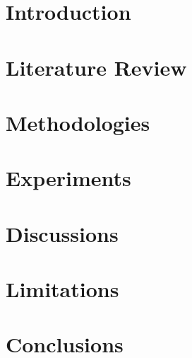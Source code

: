 \documentclass[a4paper]{ustthesis}
\begin{document}
\chapter{Introduction}
\label{ch_intro}

\newpage

% 

\chapter{Literature Review}
\label{ch_review}

\newpage

\chapter{Methodologies}
\label{ch_methodologies}

\newpage

\chapter{Experiments}
\label{ch_experiments}

\newpage

\chapter{Discussions}
\label{ch_discussions}

\newpage

\chapter{Limitations}
\label{ch_limitations}

\newpage

\chapter{Conclusions}
\label{ch_conclusions}

\newpage
\end{document}
